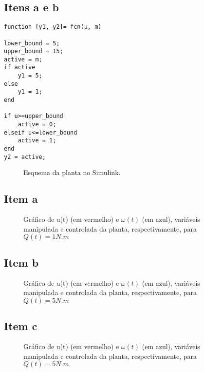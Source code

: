 \documentclass[11pt]{article}
\begin{document}
\subsection{Itens a e b}
\begin{lstlisting}[caption={Código usado para controlar a planta},captionpos=b]
function [y1, y2]= fcn(u, m)

lower_bound = 5;
upper_bound = 15;
active = m;
if active
    y1 = 5;
else
    y1 = 1;
end

if u>=upper_bound
    active = 0;
elseif u<=lower_bound
    active = 1;
end
y2 = active;
\end{lstlisting}
\begin{figure}[!htb]
        \caption{\label{fig:my-label} Esquema da planta no Simulink.}
      \end{figure}

\subsection{Item a}
\begin{figure}[!htb]
        \caption{\label{fig:my-label} Gráfico de u(t) (em vermelho) e $\omega(t)$ (em azul), variáveis manipulada e controlada da planta, respectivamente, para $Q(t) = 1 N.m$}
      \end{figure}
      
\subsection{Item b}
\begin{figure}[!htb]
        \caption{\label{fig:my-label} Gráfico de u(t) (em vermelho) e $\omega(t)$ (em azul), variáveis manipulada e controlada da planta, respectivamente, para $Q(t) = 5 N.m$}
      \end{figure}

\subsection{Item c}

\begin{figure}[!htb]
        \caption{\label{fig:my-label} Gráfico de u(t) (em vermelho) e $\omega(t)$ (em azul), variáveis manipulada e controlada da planta, respectivamente, para $Q(t) = 5 N.m$}
      \end{figure}
    
\end{document}

